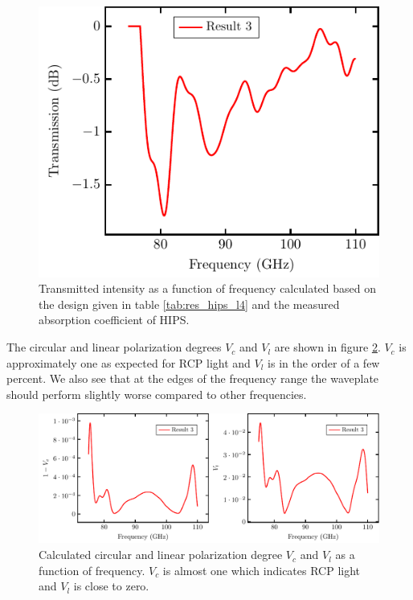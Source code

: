 \begin{figure}[H]
    \centering
    \includegraphics[scale=0.7]{images/results/plots/polymer/intensity.pdf}
    \caption{Transmitted intensity as a function of frequency calculated based on the design given in table \ref{tab:res_hips_l4} and the measured absorption coefficient of HIPS.}
    \label{fig:polymer_intensity}
\end{figure}

The circular and linear polarization degrees $V_c$ and $V_l$ are shown in figure \ref{fig:polymer_pol_deg}. $V_c$ is approximately one as expected for RCP light and $V_l$ is in the order of a few percent. We also see that at the edges of the frequency range the waveplate should perform slightly worse compared to other frequencies.

\begin{figure}[H]
    \centering
    \includegraphics[scale=0.7]{images/results/plots/polymer/polDeg.pdf}
    \caption{Calculated circular and linear polarization degree $V_c$ and $V_l$ as a function of frequency. $V_c$ is almost one which indicates RCP light and $V_l$ is close to zero.}
    \label{fig:polymer_pol_deg}
\end{figure}


